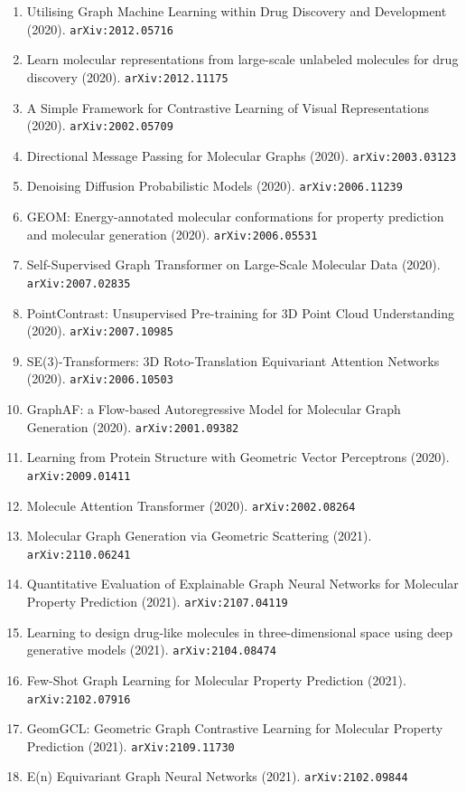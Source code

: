 \documentclass[11pt]{article}
\begin{document}
\begin{enumerate}
  \item Utilising Graph Machine Learning within Drug Discovery and Development (2020). \texttt{arXiv:2012.05716}
  \item Learn molecular representations from large-scale unlabeled molecules for
  drug discovery (2020). \texttt{arXiv:2012.11175}
  \item A Simple Framework for Contrastive Learning of Visual Representations (2020). \texttt{arXiv:2002.05709}
  \item Directional Message Passing for Molecular Graphs (2020). \texttt{arXiv:2003.03123}
  \item Denoising Diffusion Probabilistic Models (2020). \texttt{arXiv:2006.11239}
  \item GEOM: Energy-annotated molecular conformations for property prediction
  and molecular generation (2020). \texttt{arXiv:2006.05531}
  \item Self-Supervised Graph Transformer on Large-Scale Molecular Data (2020). \texttt{arXiv:2007.02835}
  \item PointContrast: Unsupervised Pre-training for 3D Point Cloud
  Understanding (2020). \texttt{arXiv:2007.10985}
  \item SE(3)-Transformers: 3D Roto-Translation Equivariant Attention Networks (2020). \texttt{arXiv:2006.10503}
  \item GraphAF: a Flow-based Autoregressive Model for Molecular Graph
  Generation (2020). \texttt{arXiv:2001.09382}
  \item Learning from Protein Structure with Geometric Vector Perceptrons (2020). \texttt{arXiv:2009.01411}
  \item Molecule Attention Transformer (2020). \texttt{arXiv:2002.08264}
  \item Molecular Graph Generation via Geometric Scattering (2021). \texttt{arXiv:2110.06241}
  \item Quantitative Evaluation of Explainable Graph Neural Networks for
  Molecular Property Prediction (2021). \texttt{arXiv:2107.04119}
  \item Learning to design drug-like molecules in three-dimensional space using
  deep generative models (2021). \texttt{arXiv:2104.08474}
  \item Few-Shot Graph Learning for Molecular Property Prediction (2021). \texttt{arXiv:2102.07916}
  \item GeomGCL: Geometric Graph Contrastive Learning for Molecular Property
  Prediction (2021). \texttt{arXiv:2109.11730}
  \item E(n) Equivariant Graph Neural Networks (2021). \texttt{arXiv:2102.09844}

\end{enumerate}
\end{document}
